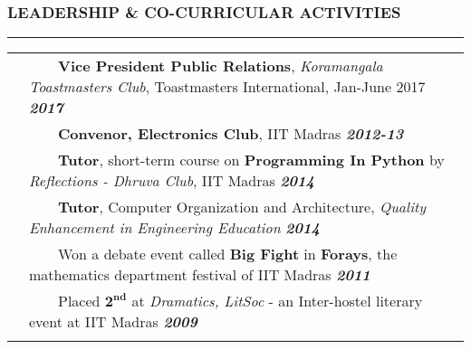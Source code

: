 \documentclass[10pt,a4paper,English]{article}
\newcommand{\lv}{\color{table-border}\vrule}
\newcommand{\lh}{\arrayrulecolor{table-border}}
\newcommand\roottitle[1]{\vspace{-4mm}\subsubsection*{\uppercase{#1}}\vspace{-0.3em}\nopagebreak[4]\hrule\vspace{4mm}}
\newcommand\itemyear[1]{\hfill \textbf{\emph{\color{itemyear} #1}}}
\newcommand{\tabitem}{~~\llap{\textbullet}~~}
\begin{document}
\roottitle{Leadership \& Co-curricular Activities}
\vspace{-4mm}
\renewcommand{\arraystretch}{1.2}
\setlength\tabcolsep{5pt}
\begin{tabularx}{\textwidth}{ !{\lv} >{} c !{\lv} X !{\lv} }
& \tabitem \textbf{Vice President Public Relations}, \textit{Koramangala Toastmasters Club}, Toastmasters International, Jan-June 2017 \itemyear{2017} \\
& \tabitem \textbf{Convenor, Electronics Club}, IIT Madras \itemyear{2012-13}\\
& \tabitem \textbf{Tutor}, short-term course on \textbf{Programming In Python} by \emph{Reflections - Dhruva Club}, IIT Madras \itemyear{ 2014 } \\
& \tabitem \textbf{Tutor}, Computer Organization and Architecture, \emph{Quality Enhancement in Engineering Education} \itemyear{2014} \\
& \tabitem Won a debate event called \textbf{Big Fight} in \textbf{Forays}, the mathematics department festival of IIT Madras \itemyear{2011} \\
& \tabitem Placed $\mathbf{2^{nd}}$ at \emph{Dramatics, LitSoc} - an Inter-hostel literary event at IIT Madras \itemyear{2009} \\ 
\lh \hline
\end{tabularx}
\vspace{2mm}

\end{document}
